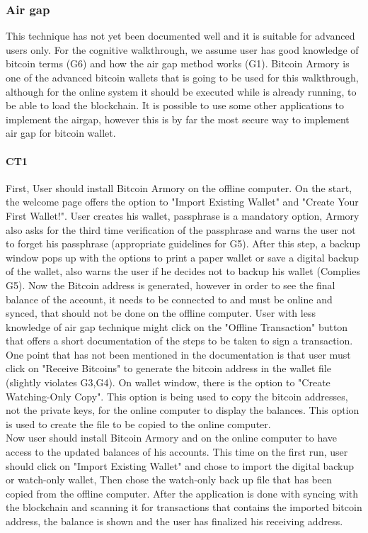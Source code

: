 
\subsubsection{Air gap}
\label{air gap}
This technique has not yet been documented well and it is suitable for advanced users only. For the cognitive walkthrough, we assume user has good knowledge of bitcoin terms (G6) and how the air gap method works (G1). Bitcoin Armory is one of the advanced bitcoin wallets that is going to be used for this walkthrough, although for the online system it should be executed while \bitcoinclient is already running, to be able to load the blockchain. It is possible to use some other applications to implement the airgap, however this is by far the most secure way to implement air gap for bitcoin wallet.

\paragraph{CT1} 
First, User should install Bitcoin Armory on the offline computer. On the start, the welcome page offers the option to "Import Existing Wallet" and "Create Your First Wallet!". User creates his wallet, passphrase is a mandatory option, Armory also asks for the third time verification of the passphrase and warns the user not to forget his passphrase (appropriate guidelines for G5). After this step, a backup window pops up with the options to print a paper wallet or save a digital backup of the wallet, also warns the user if he decides not to backup his wallet (Complies G5). Now the Bitcoin address is generated, however in order to see the final balance of the account, it needs to be connected to \bitcoinclient and \bitcoinclient must be online and synced, that should not be done on the offline computer. User with less knowledge of air gap technique might click on the "Offline Transaction" button that offers a short documentation of the steps to be taken to sign a transaction. One point that has not been mentioned in the documentation is that user must click on "Receive Bitcoins" to generate the bitcoin address in the wallet file (slightly violates G3,G4). On wallet window, there is the option to "Create Watching-Only Copy". This option is being used to copy the bitcoin addresses, not the private keys, for the online computer to display the balances. This option is used to create the file to be copied to the online computer.\\
Now user should install Bitcoin Armory and \bitcoinclient on the online computer to have access to the updated balances of his accounts. This time on the first run, user should click on "Import Existing Wallet" and chose to import the digital backup or watch-only wallet, Then chose the watch-only back up file that has been copied from the offline computer. After the application is done with syncing with the blockchain and scanning it for transactions that contains the imported bitcoin address, the balance is shown and the user has finalized his receiving address.


